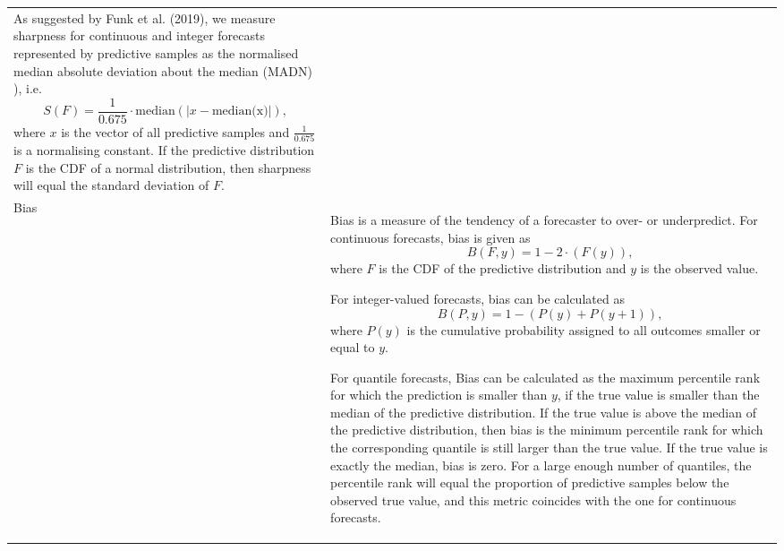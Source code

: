 \documentclass[
]{jss}
\begin{document}
\begin{CodeChunk}
\begin{longtable}[t]{>{\raggedright\arraybackslash}p{1.1in}>{\raggedright\arraybackslash}p{4.625in}}
  As suggested by Funk et al. (2019), we measure sharpness for continuous and integer forecasts represented by predictive samples as the normalised median absolute deviation about the median (MADN) ), i.e.
  $$ S(F) = \frac{1}{0.675} \cdot \text{median}(|x - \text{median(x)}|), $$
  where $x$ is the vector of all predictive samples and $\frac{1}{0.675}$ is a normalising constant. If the predictive distribution $F$ is the CDF of a normal distribution, then sharpness will equal the standard deviation of $F$.

\cellcolor{gray!6}{  For quantile forecasts we can directly use the sharpness component of the weighted interval score. Sharpness is then simply the weighted mean of the widths of the central prediction intervals.}\\
\addlinespace
Bias & Bias is a measure of the tendency of a forecaster to over- or underpredict. For continuous forecasts, bias is given as
  $$B(F, y) = 1 - 2 \cdot (F (y)), $$
  where $F$ is the CDF of the predictive distribution and $y$ is the observed value.

  For integer-valued forecasts, bias can be calculated as
  $$B(P, y) = 1 - (P(y) + P(y + 1)), $$
  where $P(y)$ is the cumulative probability assigned to all outcomes smaller or equal to $y$.

  For quantile forecasts, Bias can be calculated as the maximum percentile rank for which the prediction is smaller than $y$, if the true value is smaller than the median of the predictive distribution. If the true value is above the median of the predictive distribution, then bias is the minimum percentile rank for which the corresponding quantile is still larger than the true value. If the true value is exactly the median, bias is zero. For a large enough number of quantiles, the percentile rank will equal the proportion of predictive samples below the observed true value, and this metric coincides with the one for continuous forecasts.


\end{longtable}
\end{CodeChunk}
\end{document}

